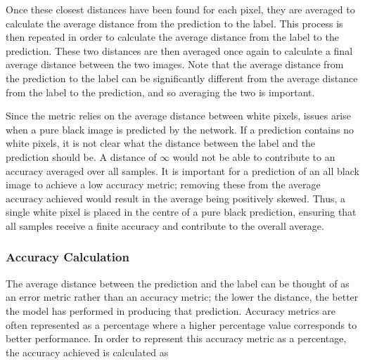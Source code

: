 Once these closest distances have been found for each pixel, they are averaged to calculate the average distance from the prediction to the label. This process is then repeated in order to calculate the average distance from the label to the prediction. These two distances are then averaged once again to calculate a final average distance between the two images. Note that the average distance from the prediction to the label can be significantly different from the average distance from the label to the prediction, and so averaging the two is important.

Since the metric relies on the average distance between white pixels, issues arise when a pure black image is predicted by the network. If a prediction contains no white pixels, it is not clear what the distance between the label and the prediction should be. A distance of $\infty$ would not be able to contribute to an accuracy averaged over all samples. It is important for a prediction of an all black image to achieve a low accuracy metric; removing these from the average accuracy achieved would result in the average being positively skewed. Thus, a single white pixel is placed in the centre of a pure black prediction, ensuring that all samples receive a finite accuracy and contribute to the overall average.


\subsubsection{Accuracy Calculation}

The average distance between the prediction and the label can be thought of as an error metric rather than an accuracy metric; the lower the distance, the better the model has performed in producing that prediction. Accuracy metrics are often represented as a percentage where a higher percentage value corresponds to better performance. In order to represent this accuracy metric as a percentage, the accuracy achieved is calculated as


